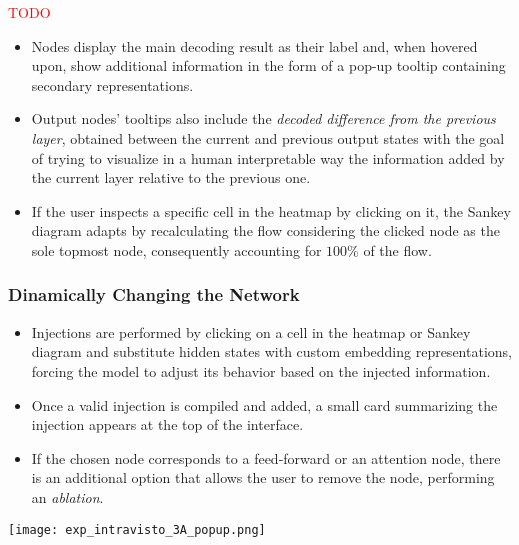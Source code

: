 \documentclass[aspectratio=169, 12pt]{beamer}
\begin{document}
    \begin{frame}{}
        \textcolor{red}{TODO}
        \begin{itemize}
            \item Nodes display the main decoding result as their label and, when hovered upon, show additional information in the form of a pop-up tooltip containing secondary representations.
            \item Output nodes' tooltips also include the \emph{decoded difference from the previous layer}, obtained between the current and previous output states with the goal of trying to visualize in a human interpretable way the information added by the current layer relative to the previous one.
            \item If the user inspects a specific cell in the heatmap by clicking on it, the Sankey diagram adapts by recalculating the flow considering the clicked node as the sole topmost node, consequently accounting for $100\%$ of the flow.
        \end{itemize}
    \end{frame}

    \subsubsection{Dinamically Changing the Network}
    \begin{frame}{}
        \begin{minipage}{0.82\textwidth}
        \begin{itemize}
            \item Injections are performed by clicking on a cell in the heatmap or Sankey diagram and substitute hidden states with custom embedding representations, forcing the model to adjust its behavior based on the injected information.
            \item Once a valid injection is compiled and added, a small card summarizing the injection appears at the top of the interface.
            \item If the chosen node corresponds to a feed-forward or an attention node, there is an additional option that allows the user to remove the node, performing an \emph{ablation}.
        \end{itemize}
        \end{minipage}%
        \begin{minipage}{0.18\textwidth}
            \centering
            \texttt{[image: exp\_intravisto\_3A\_popup.png]}
        \end{minipage}
    \end{frame}
\end{document}
